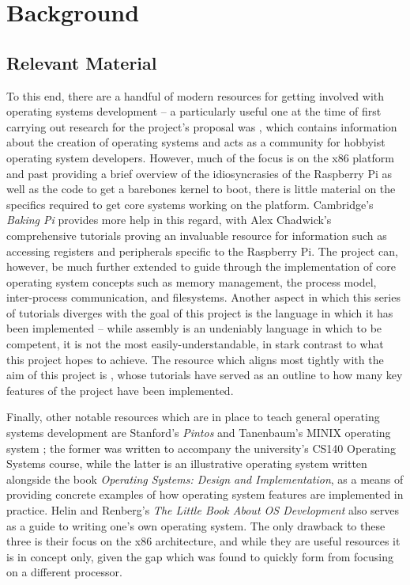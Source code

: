 \section{Background}
\subsection{Relevant Material}
    To this end, there are a handful of modern resources for getting involved
    with operating systems development -- a particularly useful one at the time
    of first carrying out research for the project's proposal was
    , which contains information about the creation of
    operating systems and acts as a community for hobbyist operating system
    developers. However, much of the focus is on the x86 platform and past
    providing a brief overview of the idiosyncrasies of the Raspberry Pi as well
    as the code to get a barebones kernel to boot, there is little material on
    the specifics required to get core systems working on the platform.
    Cambridge's \textit{Baking Pi} \cite{BakingPi} provides more help in this
    regard, with Alex Chadwick's comprehensive tutorials proving an invaluable
    resource for information such as accessing registers and peripherals
    specific to the Raspberry Pi. The project can, however, be much further
    extended to guide through the implementation of core operating system
    concepts such as memory management, the process model, inter-process
    communication, and filesystems. Another aspect in which this series of
    tutorials diverges with the goal of this project is the language in which it
    has been implemented -- while assembly is an undeniably language in which to
    be competent, it is not the most easily-understandable, in stark contrast to
    what this project hopes to achieve. The resource which aligns most tightly
    with the aim of this project is \cite{jsandler}, whose tutorials have served
    as an outline to how many key features of the project have been implemented.
    
    Finally, other notable resources which are in place to teach general
    operating systems development are Stanford's \textit{Pintos} \cite{Pintos}
    and Tanenbaum's MINIX operating system \cite{MINIX}; the former was written
    to accompany the university's CS140 Operating Systems course, while the
    latter is an illustrative operating system written alongside the book
    \textit{Operating Systems: Design and Implementation}, as a means of
    providing concrete examples of how operating system features are implemented
    in practice. Helin and Renberg's \textit{The Little Book About OS
    Development} \cite{littleosbook} also serves as a guide to writing one's own
    operating system. The only drawback to these three is their focus on the x86
    architecture, and while they are useful resources it is in concept only,
    given the gap which was found to quickly form from focusing on a different
    processor.


